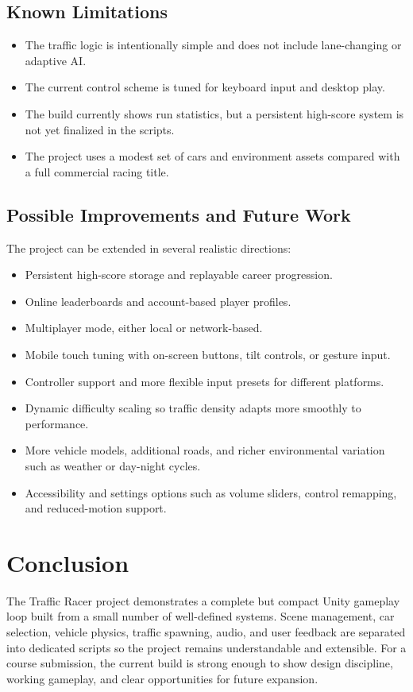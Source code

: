 \documentclass[12pt,a4paper]{article}
\begin{document}
\subsection{Known Limitations}
\begin{itemize}
    \item The traffic logic is intentionally simple and does not include lane-changing or adaptive AI.
    \item The current control scheme is tuned for keyboard input and desktop play.
    \item The build currently shows run statistics, but a persistent high-score system is not yet finalized in the scripts.
    \item The project uses a modest set of cars and environment assets compared with a full commercial racing title.
\end{itemize}

\subsection{Possible Improvements and Future Work}
The project can be extended in several realistic directions:
\begin{itemize}
    \item Persistent high-score storage and replayable career progression.
    \item Online leaderboards and account-based player profiles.
    \item Multiplayer mode, either local or network-based.
    \item Mobile touch tuning with on-screen buttons, tilt controls, or gesture input.
    \item Controller support and more flexible input presets for different platforms.
    \item Dynamic difficulty scaling so traffic density adapts more smoothly to performance.
    \item More vehicle models, additional roads, and richer environmental variation such as weather or day-night cycles.
    \item Accessibility and settings options such as volume sliders, control remapping, and reduced-motion support.
\end{itemize}

\section{Conclusion}
The Traffic Racer project demonstrates a complete but compact Unity gameplay loop built from a small number of well-defined systems. Scene management, car selection, vehicle physics, traffic spawning, audio, and user feedback are separated into dedicated scripts so the project remains understandable and extensible. For a course submission, the current build is strong enough to show design discipline, working gameplay, and clear opportunities for future expansion.
\end{document}
